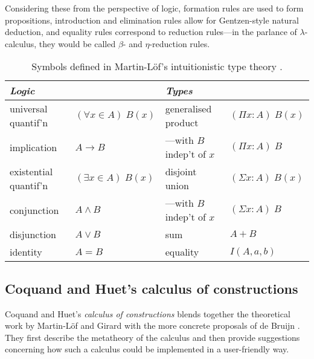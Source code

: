 \documentclass[12pt,toc=bibliography,numbers=noendperiod,
               footnotes=multiple,twoside]{scrartcl}
\begin{document}
Considering these from the perspective of logic, formation rules are used to form propositions, introduction and elimination rules allow for Gentzen-style natural deduction, and equality rules correspond to reduction rules---in the parlance of \(\lambda\)-calculus, they would be called \(\beta\)- and \(\eta\)-reduction rules.

\begin{table}[h]
    \centering
    \begin{tabular}{l l l l}
        \toprule
        \textit{Logic} & & \textit{Types} & \\
        \midrule
	universal quantif'n & \((\forall x \in A)\;B(x)\)
		& generalised product & \((\Pi x : A)\;B(x)\) \\
	implication & \(A \rightarrow B\)
		& ---with \(B\) indep't of \(x\) & \((\Pi x : A)\;B\) \\
	existential quantif'n & \((\exists x \in A)\;B(x)\)
		& disjoint union & \((\Sigma x : A)\;B(x)\) \\
	conjunction & \(A \wedge B\)
		& ---with \(B\) indep't of \(x\) & \((\Sigma x : A)\;B\) \\
	disjunction & \(A \vee B\)
		& sum & \(A + B\) \\
	identity & \(A = B\)
		& equality & \(I(A, a, b)\) \\
	
        \bottomrule
    \end{tabular}
    \caption{Symbols defined in Martin-Löf's intuitionistic type theory \parencite{sambin_intuitionistic_1984}.}
    \label{tab:martin-loef}
\end{table}

\subsection{Coquand and Huet's calculus of constructions}

Coquand and Huet's \emph{calculus of constructions} blends together the theoretical work by Martin-Löf and Girard with the more concrete proposals of de Bruijn \autocite{coquand_calculus_1988}. They first describe the metatheory of the calculus and then provide suggestions concerning how such a calculus could be implemented in a user-friendly way.
\end{document}
